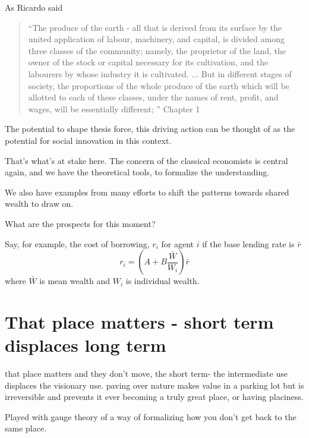 As Ricardo said
\begin{quotation}   
 “The produce of the earth - all that is derived from its surface by the united application of labour, machinery, and capital, is divided among three classes of the community; namely, the proprietor of the land, the owner of the stock or capital necessary for its cultivation, and the labourers by whose industry it is cultivated. ...  But in different stages of society, the proportions of the whole produce of the earth which will be allotted to each of these classes, under the names of rent, profit, and wages, will be essentially different; ”  Chapter 1
\end{quotation}


The potential to shape thesis force, this driving action can be thought of as the potential for social innovation in this context.


That's what's at stake here.
The concern of the classical economists is central again, and we have the theoretical tools, to formalize the understanding.

We also have examples from many efforts to shift the patterns towards shared wealth to draw on. 

What are the prospects for this moment?

Say, for example, the cost of borrowing, $r_i$ for agent $i$ if the base lending rate is $\bar{r}$
\[ r_i = (A + B \frac{\bar{W}}{W_i})\bar r\]
where $\bar{W}$ is mean wealth and $W_i$ is individual wealth. %


\section{That place matters - short term displaces long term}
that place matters and they don't move, the short term- the intermediate use displaces the visionary use. 
paving over nature makes value in a parking lot but is irreversible and prevents it ever becoming a truly great place, or having placiness.

Played with gauge theory of a way of formalizing how you don't get back to the same place. 